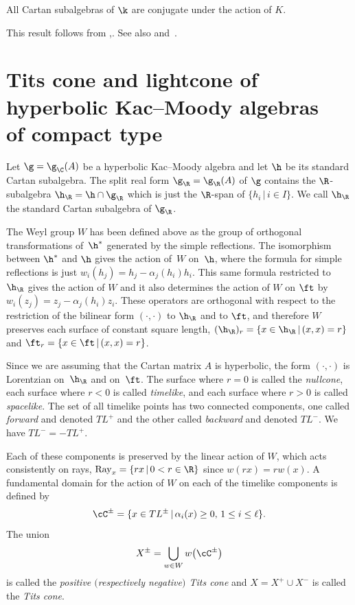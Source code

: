 \begin{Proposition}
\label{proposition:Cartancompactconjugate}
All Cartan subalgebras of $\k$ are conjugate under the action of $K$.
\end{Proposition}

This result follows from \cite[Proposition~8.1(iii)]{Caprace09},. See also \cite[Corollary 5.33]{KacWang92} and~\cite[Proposition 3.5]{KacPeterson87}.

\section[Tits cone and lightcone of hyperbolic Kac--Moody algebras of compact type]{Tits cone and lightcone of hyperbolic Kac--Moody algebras\\ of compact type}

Let $\g = \g_\C(A)$ be a hyperbolic Kac--Moody algebra and let $\h$ be its standard Cartan subalgebra.
The split real form $\g_\R = \g_\R(A)$ of $\g$ contains the $\R$-subalgebra $\h_{\R}=\h\cap \g_{\R}$ which is just the $\R$-span of $\{h_i \,|\, i\in I\}$. We call $\h_{\R}$ the standard Cartan subalgebra of $\g_\R$.

The Weyl group $W$ has been defined above as the group of orthogonal transformations of~$\h^*$ generated by the simple reflections. The isomorphism between $\h^*$ and $\h$ gives the action of~$W$ on~$\h$, where the formula for simple reflections is just $w_i(h_j) = h_j - \alpha_j(h_i)h_i$. This same formula restricted to $\h_{\R}$ gives the action of $W$ and it also determines the action of $W$ on $\ft$ by $w_i(z_j) = z_j - \alpha_j(h_i)z_i$. These operators are orthogonal with respect to the restriction of the bilinear form $(\cdot,\cdot)$ to $\h_\R$ and to $\ft$, and therefore $W$ preserves each surface of constant
square length, $(\h_\R)_r = \{x\in\h_\R \, |\, (x,x) = r\}$ and $\ft_r = \{x\in\ft \, |\, (x,x) = r\}$.

Since we are assuming that the Cartan matrix $A$ is hyperbolic, the form $(\cdot,\cdot)$ is Lorentzian on~$\h_\R$ and on~$\ft$. The surface where $r=0$ is called the {\it nullcone}, each surface where $r < 0$ is called {\it timelike}, and each surface where $r > 0$ is
called {\it spacelike}. The set of all timelike points has two connected components, one called {\it forward} and denoted $TL^+$ and the other called {\it backward} and denoted $TL^-$. We have $TL^- = - TL^+$.

Each of these components is preserved by the linear action of $W$, which acts consistently on rays, ${\rm Ray}_x = \{rx\, | \, 0 < r\in\R\}$ since
$w(rx) = r w(x)$. A fundamental domain for the action of $W$ on each of the timelike components is defined by
\[\cC^\pm = \{x\in TL^\pm\, |\, \alpha_i(x) \geq 0,\, 1\leq i\leq \ell \}.\]
The union
\[X^\pm = \bigcup_{w\in W} w\big(\cC^\pm\big)\]
is called the {\it positive $($respectively negative$)$ Tits cone} and $X = X^+\cup X^-$ is called the {\it Tits cone}.

